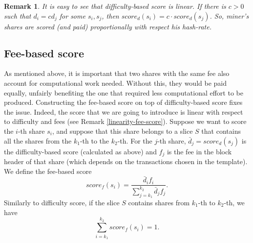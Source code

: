 \documentclass[10pt]{article}
\newtheorem{remark}{Remark}[subsection]
\begin{document}
\begin{remark} \label{linearity-diff-score} It is easy to see that difficulty-based score is linear.
If there is $c>0$ such that $d_i = cd_j$ for some $s_i, s_j$, then $score_d(s_i) = c \cdot score_d(s_j)$. So, miner's shares are scored (and paid) proportionally with respect his hash-rate.
\end{remark}
\subsection{Fee-based score}
As mentioned above, it is important that two shares with the same fee also account for computational work needed. Without this, they would be paid equally, unfairly benefiting the one that required less computational effort to be produced. Constructing the fee-based score on top of difficulty-based score fixes the issue. Indeed, the score that we are going to introduce is linear with respect to difficulty and fees (see Remark \ref{linearity-fee-score}).\newline
Suppose we want to score the $i$-th share $s_i$, and suppose that this share belongs to a slice $S$ that contains all the shares from the $k_1$-th to the $k_2$-th.
For the $j$-th share, $\bar d_j = score_d(s_j)$ is the difficulty-based score (calculated as above) and $f_j$ is the fee in the block header of that share (which depends on the transactions chosen in the template). We define the fee-based score
\[
score_f(s_i) = \frac{\bar d_if_i}{\sum_{j=k_1}^{k_2}\bar d_j f_j}.
\]
Similarly to difficulty score, if the slice $S$ contains shares from $k_1$-th to $k_2$-th, we have \[\sum_{i=k_1}^{k_2} score_f(s_i) = 1. \] \label{addstoone}
\end{document}
